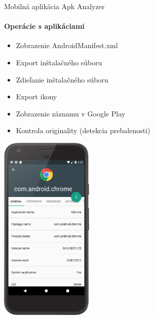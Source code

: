 \documentclass{beamer}
\begin{document}
  \begin{frame}[label=lists]{Mobilná aplikácia Apk Analyzer}
 	 \framesubtitle{Operácie s aplikáciami}
	\begin{minipage}[htb]{\textwidth}
		\begin{minipage}[t]{0.5\textwidth}
			\hbox{}
			\hbox{}
			\begin{itemize}
				\item Zobrazenie AndroidManifest.xml
				\item Export inštalačného súboru
				\item Zdieľanie inštalačného súboru
				\item Export ikony
				\item Zobrazenie záznamu v Google Play
				\item Kontrola originality (detekcia prebalenosti)
			\end{itemize}
     		\vfill
		\end{minipage}%
	\hfill
	\centering
		\begin{minipage}[t][][b]{0.4\textwidth}
		\centering
		\includegraphics[height=9cm]{images/app/detail_device.png}
		\label{fig:app-detail}
		\end{minipage}%
	\end{minipage}
  \end{frame}   
\end{document}
